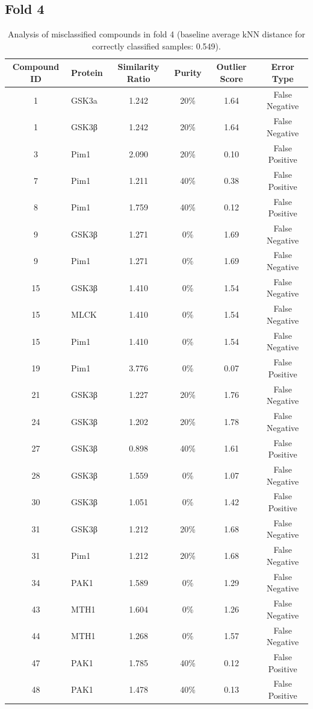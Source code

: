 \documentclass{article}
\newenvironment{smarttabular}[1]{%
    \begin{tabular}{#1}%
}{%
    \end{tabular}%
}
\begin{document}
\clearpage

\subsection{Fold 4}

\begin{table}[H]
    \centering
    \small
    \caption{Analysis of misclassified compounds in fold 4 (baseline average kNN distance for correctly classified samples: 0.549).}
    \label{tab:misclassified_compounds_4}
    \begin{smarttabular}{clcccc}
        \toprule
        \textbf{Compound ID} & \textbf{Protein} & \textbf{Similarity Ratio} & \textbf{Purity} & \textbf{Outlier Score} & \textbf{Error Type} \\
        \midrule
        1 & GSK3a & 1.242 & 20\% & 1.64 & False Negative \\
        1 & GSK3β & 1.242 & 20\% & 1.64 & False Negative \\
        3 & Pim1 & 2.090 & 20\% & 0.10 & False Positive \\
        7 & Pim1 & 1.211 & 40\% & 0.38 & False Positive \\
        8 & Pim1 & 1.759 & 40\% & 0.12 & False Positive \\
        9 & GSK3β & 1.271 & 0\% & 1.69 & False Negative \\
        9 & Pim1 & 1.271 & 0\% & 1.69 & False Negative \\
        15 & GSK3β & 1.410 & 0\% & 1.54 & False Negative \\
        15 & MLCK & 1.410 & 0\% & 1.54 & False Negative \\
        15 & Pim1 & 1.410 & 0\% & 1.54 & False Negative \\
        19 & Pim1 & 3.776 & 0\% & 0.07 & False Positive \\
        21 & GSK3β & 1.227 & 20\% & 1.76 & False Negative \\
        24 & GSK3β & 1.202 & 20\% & 1.78 & False Negative \\
        27 & GSK3β & 0.898 & 40\% & 1.61 & False Positive \\
        28 & GSK3β & 1.559 & 0\% & 1.07 & False Negative \\
        30 & GSK3β & 1.051 & 0\% & 1.42 & False Positive \\
        31 & GSK3β & 1.212 & 20\% & 1.68 & False Negative \\
        31 & Pim1 & 1.212 & 20\% & 1.68 & False Negative \\
        34 & PAK1 & 1.589 & 0\% & 1.29 & False Negative \\
        43 & MTH1 & 1.604 & 0\% & 1.26 & False Negative \\
        44 & MTH1 & 1.268 & 0\% & 1.57 & False Negative \\
        47 & PAK1 & 1.785 & 40\% & 0.12 & False Positive \\
        48 & PAK1 & 1.478 & 40\% & 0.13 & False Positive \\
        \bottomrule
    \end{smarttabular}
\end{table}
\end{document}
